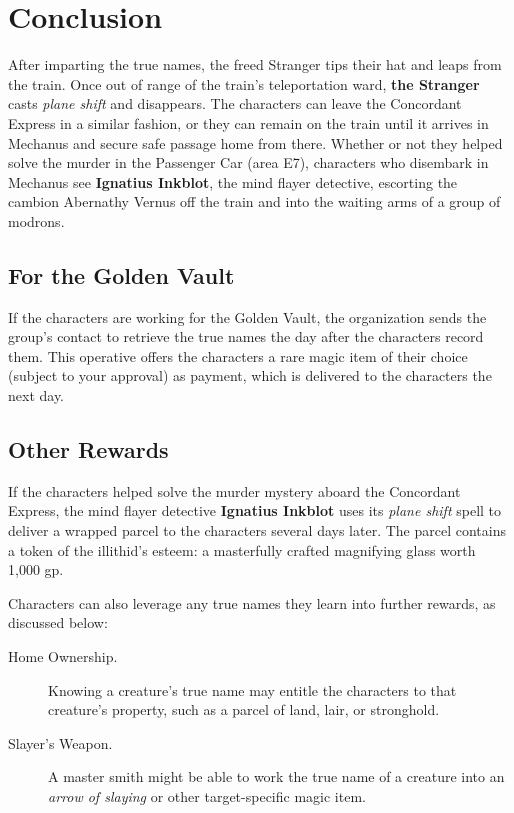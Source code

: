 \documentclass[10pt,a4paper,twoside,bg=print,twocolumn,openany,nodeprecatedcode]{dndarticle}
\begin{document}
\section{Conclusion}
After imparting the true names, the freed Stranger tips their hat and leaps from the train. Once out of range of the train's teleportation ward, \textbf{the Stranger} casts \textit{plane shift} and disappears. The characters can leave the Concordant Express in a similar fashion, or they can remain on the train until it arrives in Mechanus and secure safe passage home from there. Whether or not they helped solve the murder in the Passenger Car (area E7), characters who disembark in Mechanus see \textbf{Ignatius Inkblot}, the mind flayer detective, escorting the cambion Abernathy Vernus off the train and into the waiting arms of a group of modrons.

\subsection{For the Golden Vault}
If the characters are working for the Golden Vault, the organization sends the group's contact to retrieve the true names the day after the characters record them. This operative offers the characters a rare magic item of their choice (subject to your approval) as payment, which is delivered to the characters the next day.

\subsection{Other Rewards}
If the characters helped solve the murder mystery aboard the Concordant Express, the mind flayer detective \textbf{Ignatius Inkblot} uses its \textit{plane shift} spell to deliver a wrapped parcel to the characters several days later. The parcel contains a token of the illithid's esteem: a masterfully crafted magnifying glass worth 1,000 gp.

Characters can also leverage any true names they learn into further rewards, as discussed below:


\begin{description}
\item[Home Ownership.]
Knowing a creature's true name may entitle the characters to that creature's property, such as a parcel of land, lair, or stronghold.
\item[Slayer's Weapon.]
A master smith might be able to work the true name of a creature into an \textit{arrow of slaying} or other target-specific magic item.
\end{description}
\end{document}
